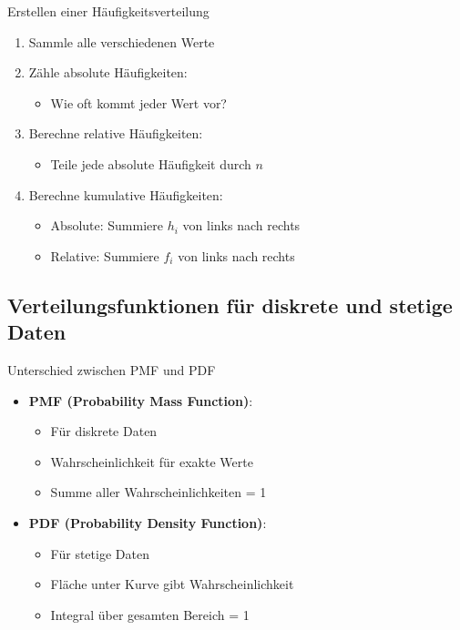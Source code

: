 \begin{KR}{Erstellen einer Häufigkeitsverteilung}
\begin{enumerate}
    \item Sammle alle verschiedenen Werte
    \item Zähle absolute Häufigkeiten:
        \begin{itemize}
            \item Wie oft kommt jeder Wert vor?
        \end{itemize}
    \item Berechne relative Häufigkeiten:
        \begin{itemize}
            \item Teile jede absolute Häufigkeit durch $n$
        \end{itemize}
    \item Berechne kumulative Häufigkeiten:
        \begin{itemize}
            \item Absolute: Summiere $h_i$ von links nach rechts
            \item Relative: Summiere $f_i$ von links nach rechts
        \end{itemize}
\end{enumerate}
\end{KR}

\subsection{Verteilungsfunktionen für diskrete und stetige Daten}

\begin{concept}{Unterschied zwischen PMF und PDF}
\begin{itemize}
    \item \textbf{PMF (Probability Mass Function)}:
        \begin{itemize}
            \item Für diskrete Daten
            \item Wahrscheinlichkeit für exakte Werte
            \item Summe aller Wahrscheinlichkeiten = 1
        \end{itemize}
    \item \textbf{PDF (Probability Density Function)}:
        \begin{itemize}
            \item Für stetige Daten
            \item Fläche unter Kurve gibt Wahrscheinlichkeit
            \item Integral über gesamten Bereich = 1
        \end{itemize}
\end{itemize}
\end{concept}

